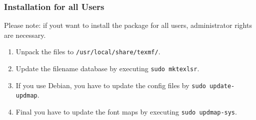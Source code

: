 \documentclass{scrartcl}
\begin{document}
%
%
\subsubsection{Installation for all Users}
Please note: if yout want to install the \rmlatex package for all users, administrator rights are necessary.
\begin{enumerate}		
	\item Unpack the files to \texttt{/usr/local/share/texmf/}.
	\item Update the filename database by executing \texttt{sudo mktexlsr}.
	\item If you use Debian, you have to update the config files by \texttt{sudo update-updmap}.
	\item Final you have to update the font maps by executing \texttt{sudo updmap-sys}.
\end{enumerate}
\end{document}
